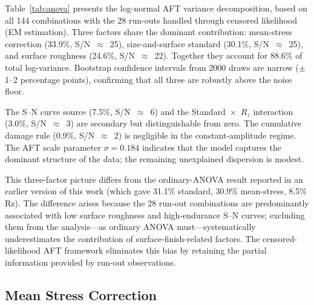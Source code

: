 \documentclass[12pt,a4paper]{article}
\begin{document}
Table~\ref{tab:anova} presents the log-normal AFT variance
decomposition, based on all 144 combinations with the 28 run-outs
handled through censored likelihood (EM estimation). Three factors share the
dominant contribution: mean-stress correction (33.9\%, S/N~$\approx$~25),
size-and-surface standard (30.1\%, S/N~$\approx$~25), and surface roughness
(24.6\%, S/N~$\approx$~22). Together they account for 88.6\% of total
log-variance. Bootstrap confidence intervals from 2000 draws are narrow
($\pm$1--2 percentage points), confirming that all three are robustly
above the noise floor.

The S--N curve source (7.5\%, S/N~$\approx$~6) and the
Standard~$\times$~$R_z$ interaction (3.0\%, S/N~$\approx$~3) are secondary but
distinguishable from zero. The cumulative damage rule (0.9\%,
S/N~$\approx$~2) is negligible in the constant-amplitude regime. The
AFT scale parameter $\sigma = 0.184$ indicates that the model
captures the dominant structure of the data; the remaining
unexplained dispersion is modest.

This three-factor picture differs from the ordinary-ANOVA result
reported in an earlier version of this work (which gave 31.1\%
standard, 30.9\% mean-stress, 8.5\% Rz). The difference arises
because the 28 run-out combinations are predominantly associated
with low surface roughness and high-endurance S--N curves; excluding
them from the analysis---as ordinary ANOVA must---systematically
underestimates the contribution of surface-finish-related factors.
The censored-likelihood AFT framework eliminates this bias by
retaining the partial information provided by run-out observations.

\subsection{Mean Stress Correction}
\end{document}
